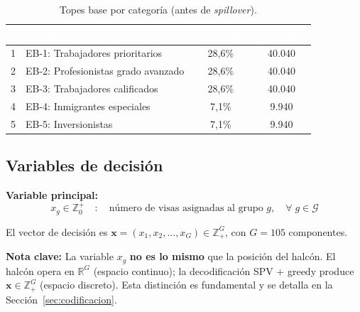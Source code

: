 \documentclass[12pt,letterpaper]{article}
\begin{document}
\begin{table}[H]
\centering
\caption{Topes base por categoría (antes de \textit{spillover}).}
\label{tab:caps_cat}
\renewcommand{\arraystretch}{1.3}
\begin{tabular}{clcc}
\toprule
\rowcolor{tablehead}
\textcolor{white}{\textbf{$j$}} & \textcolor{white}{\textbf{Categoría}} & \textcolor{white}{\textbf{Porcentaje}} & \textcolor{white}{\textbf{$K_j$ (visas)}} \\
\midrule
1 & EB-1: Trabajadores prioritarios & 28,6\% & 40.040 \\
\rowcolor{gray!8}
2 & EB-2: Profesionistas grado avanzado & 28,6\% & 40.040 \\
3 & EB-3: Trabajadores calificados & 28,6\% & 40.040 \\
\rowcolor{gray!8}
4 & EB-4: Inmigrantes especiales & 7,1\% & 9.940 \\
5 & EB-5: Inversionistas & 7,1\% & 9.940 \\
\bottomrule
\end{tabular}
\end{table}

\subsection{Variables de decisión}

\begin{formulabox}
\textbf{Variable principal:}
\begin{equation}
x_g \in \mathbb{Z}^{+}_0 \quad : \quad \text{número de visas asignadas al grupo } g, \quad \forall \; g \in \mathcal{G}
\label{eq:variable}
\end{equation}

\vspace{0.3em}
El vector de decisión es $\mathbf{x} = (x_1, x_2, \ldots, x_G) \in \mathbb{Z}^{G}_{+}$, con $G = 105$ componentes.
\end{formulabox}

\begin{notebox}
\textbf{Nota clave:} La variable $x_g$ \textbf{no es lo mismo} que la posición del halcón. El halcón opera en $\mathbb{R}^G$ (espacio continuo); la decodificación SPV + greedy produce $\mathbf{x} \in \mathbb{Z}^G_{+}$ (espacio discreto). Esta distinción es fundamental y se detalla en la Sección~\ref{sec:codificacion}.
\end{notebox}

\newpage
\end{document}
